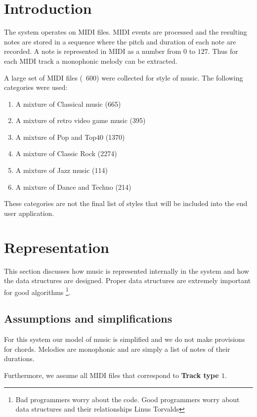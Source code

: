 

\chapter{Introduction}
The system operates on MIDI files. MIDI events are processed and the resulting notes are stored in a sequence where the pitch and duration of each note are recorded. A note is represented in MIDI as a number from $0$ to $127$.
Thus for each MIDI track a monophonic melody can be extracted.

A large set of MIDI files (~600) were collected for style of music. The following categories were used:
\begin{enumerate}
\item A mixture of Classical music (665)
\item A mixture of retro video game music (395)
\item A mixture of Pop and Top40 (1370)
\item A mixture of Classic Rock (2274)
\item A mixture of Jazz music (114)
\item A mixture of Dance and Techno (214)
\end{enumerate}

These categories are not the final list of styles that will be included into the end user application.


\chapter{Representation}
This section discusses how music is represented internally in the system and how the data structures are designed. 
Proper data structures are extremely important for good algorithms \footnote{Bad programmers worry about the code. Good programmers worry about data structures and their relationships \mytilde Linus Torvalds}.

\section{Assumptions and simplifications}
For this system our model of music is simplified and we do not make provisions for chords. Melodies are monophonic and are simply a list of notes of their durations.

Furthermore, we assume all MIDI files that correspond to \textbf{Track type $1$}.

